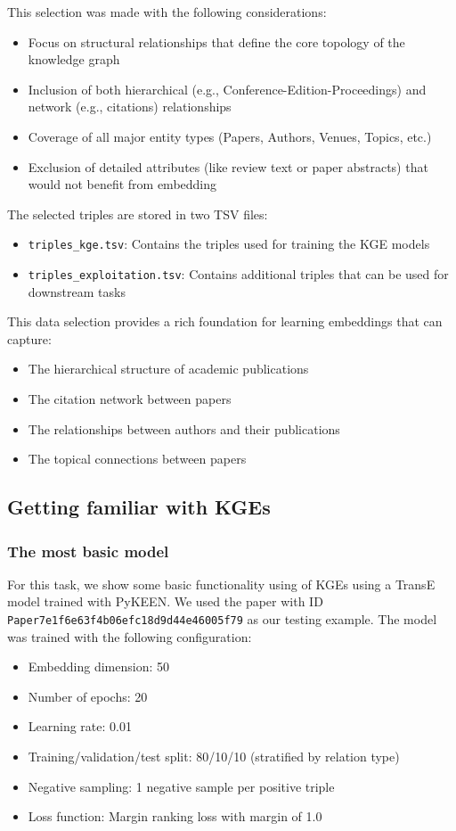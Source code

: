 \documentclass[10pt,a4paper]{article}
\begin{document}
This selection was made with the following considerations:
\begin{itemize}
    \item Focus on structural relationships that define the core topology of the knowledge graph
    \item Inclusion of both hierarchical (e.g., Conference-Edition-Proceedings) and network (e.g., citations) relationships
    \item Coverage of all major entity types (Papers, Authors, Venues, Topics, etc.)
    \item Exclusion of detailed attributes (like review text or paper abstracts) that would not benefit from embedding
\end{itemize}

The selected triples are stored in two TSV files:
\begin{itemize}
    \item \texttt{triples\_kge.tsv}: Contains the triples used for training the KGE models
    \item \texttt{triples\_exploitation.tsv}: Contains additional triples that can be used for downstream tasks
\end{itemize}

This data selection provides a rich foundation for learning embeddings that can capture:
\begin{itemize}
    \item The hierarchical structure of academic publications
    \item The citation network between papers
    \item The relationships between authors and their publications
    \item The topical connections between papers
\end{itemize}

\subsection{Getting familiar with KGEs}

\subsubsection{The most basic model}

For this task, we show some basic functionality using of KGEs using a TransE model trained with PyKEEN. We used the paper with ID \texttt{Paper7e1f6e63f4b06efc18d9d44e46005f79} as our testing example. The model was trained with the following configuration:
\begin{itemize}
    \item Embedding dimension: 50
    \item Number of epochs: 20
    \item Learning rate: 0.01
    \item Training/validation/test split: 80/10/10 (stratified by relation type)
    \item Negative sampling: 1 negative sample per positive triple
    \item Loss function: Margin ranking loss with margin of 1.0
\end{itemize}
\end{document}
